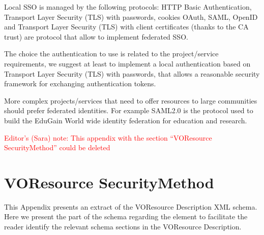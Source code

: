 \documentclass[11pt,a4paper]{ivoa}
\begin{document}
Local SSO is managed by  the following protocols: HTTP Basic
Authentication,  Transport Layer Security (TLS) with passwords, cookies
OAuth, SAML, OpenID and Transport Layer Security (TLS) with client
certificates (thanks to the CA trust) are protocol that
allow to implement  federated SSO.

The choice the authentication  to use is related to the project/service
requirements, we suggest at least to implement
a local authentication based on Transport Layer Security (TLS) with
passwords, that allows a reasonable security
framework for exchanging authentication tokens.

More complex projects/services that need to offer resources to large
communities should prefer federated identities.
For example SAML2.0 is the protocol used to build the EduGain World wide
identity federation  for education and research.

\textcolor{red}{Editor's (Sara) note: This appendix with the section
``VOResource  SecurityMethod'' could be deleted}

\appendix
\section{VOResource  SecurityMethod}
This Appendix presents an extract of the VOResource Description XML
schema. Here we present the part of the schema regarding the
 element
to facilitate the reader identify the relevant schema sections in the
VOResource Description.
\end{document}

